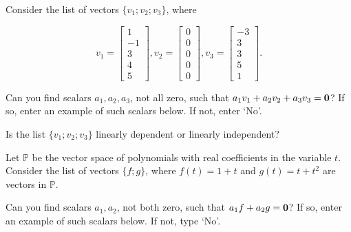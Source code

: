 \edXsolution{ 
}


\endedxproblem





Consider the list of vectors $\{v_1; v_2; v_3\}$, where

\[v_1 = \left[\begin{array}{c} 1 \\ -1  \\ 3 \\ 4 \\5 \end{array} \right], 
v_2 = \left[\begin{array}{c} 0 \\ 0  \\ 0 \\ 0 \\ 0 \end{array} \right],  
v_3 = \left[\begin{array}{c} -3 \\ 3  \\ 3 \\ 5 \\ 1 \end{array} \right]. \]

Can you find scalars $a_1, a_2, a_3$, not all zero, such that 
$a_1v_1 + a_2 v_2 + a_3 v_3 = \mathbf{0}$?  If so, enter an example of such scalars below.
If not, enter `No'.  



Is the list $\{v_1; v_2; v_3\}$ linearly dependent or linearly independent?  


\edXsolution{ 
}


\endedxproblem






Let $\mathbb{P}$ be the vector space of polynomials with real coefficients in the variable $t$.  
Consider the list of vectors $\{f; g\}$, where $f(t) = 1+t$ and $g(t) = t+t^2$ are
vectors in $\mathbb{P}$.

Can you find scalars $a_1, a_2$, not both zero, such that 
$a_1f + a_2 g = \mathbf{0}$?  If so, enter an example of such scalars below.
If not, type `No'.  



